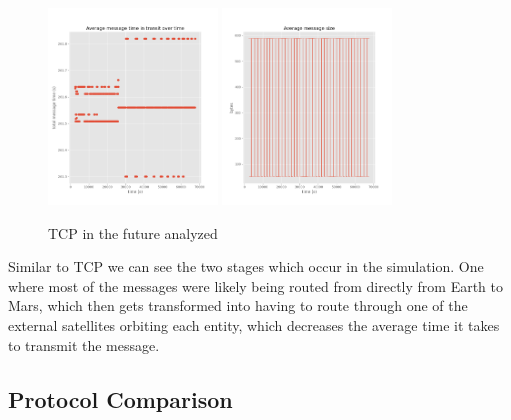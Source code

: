 \documentclass[a4paper,12pt]{article}
\begin{document}
\begin{figure}[h]
  \centering
  \includegraphics[width=0.4\textwidth]{media/new_reno.png}
  \includegraphics[width=0.4\textwidth]{media/new_reno_data.png}
  \caption{TCP in the future analyzed}
\end{figure}

Similar to TCP we can see the two stages which occur in the simulation. One
where most of the messages were likely being routed from directly from Earth to
Mars, which then gets transformed into having to route through one of the
external satellites orbiting each entity, which decreases the average time it
takes to transmit the message.

\subsection{Protocol Comparison}
\end{document}
